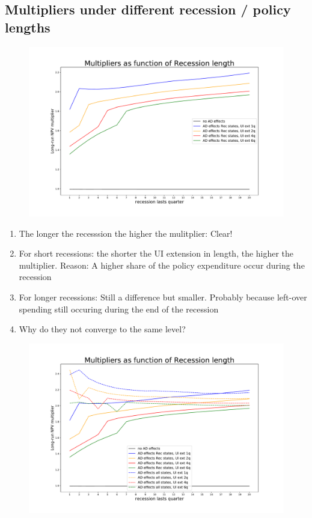 \documentclass[]{article}
\begin{document}
\subsection{Multipliers under different recession / policy lengths}
\begin{figure}[h]
	\centering
	\includegraphics[width=1\linewidth]{../FullRun_Apr04_AD05_AllStates/Multipliers_RecLength_PolicyLength1}
\end{figure}

\begin{enumerate}
	\item The longer the recesssion the higher the mulitplier: Clear!
	\item For short recessions: the shorter the UI extension in length, the higher the multiplier. Reason: A higher share of the policy expenditure occur during the recession
	\item For longer recessions: Still a difference but smaller. Probably because left-over spending still occuring during the end of the recession
	\item Why do they not converge to the same level?
\end{enumerate}

\begin{figure}[h]
	\centering
	\includegraphics[width=1\linewidth]{../FullRun_Apr04_AD05_AllStates/Multipliers_RecLength_PolicyLength2}
\end{figure}
\end{document}
